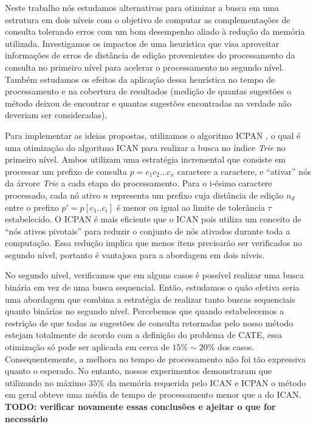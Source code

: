 Neste trabalho nós estudamos alternativas para otimizar a busca em uma estrutura em dois níveis com o objetivo de computar as complementações de consulta tolerando erros com um bom desempenho aliado à redução da memória utilizada. Investigamos os impactos de uma heurística que visa aproveitar informações de erros de distância de edição provenientes do processamento da consulta no primeiro nível para acelerar o processamento no segundo nível. Também estudamos os efeitos da aplicação dessa heurística no tempo de processamento e na cobertura de resultados (medição de quantas sugestões o método deixou de encontrar e quantas sugestões encontradas na verdade não deveriam ser consideradas). 

Para implementar as ideias propostas, utilizamos o algoritmo ICPAN \citep{li2011efficient}, o qual é uma otimização do algoritmo ICAN \citep{ji2009efficient} para realizar a busca no índice \textit{Trie} no primeiro nível. Ambos utilizam uma estratégia incremental que consiste em processar um prefixo de consulta $p=c_{1}c_{2}...c_{x}$ caractere a caractere, e ``ativar'' nós da árvore \textit{Trie} a cada etapa do processamento. Para o i-ésimo caractere processado, cada nó ativo $n$ representa um prefixo cuja distância de edição $n_{d}$ entre o prefixo $p'=p[c_{1}..c_{i}]$ é menor ou igual ao limite de tolerância $\tau$ estabelecido. O ICPAN é mais eficiente que o ICAN pois utiliza um conceito de ``nós ativos pivotais'' para reduzir o conjunto de nós ativados durante toda a computação. Essa redução implica que menos itens precisarão ser verificados no segundo nível, portanto é vantajosa para a abordagem em dois níveis.

No segundo nível, verificamos que em alguns casos é possível realizar uma busca binária em vez de uma busca sequencial. Então, estudamos o quão efetiva seria uma abordagem que combina a estratégia de realizar tanto buscas sequenciais quanto binárias no segundo nível. Percebemos que quando estabelecemos a restrição de que todas as sugestões de consulta retornadas pelo nosso método estejam totalmente de acordo com a definição do problema de CATE, essa otimização só pode ser aplicada em cerca de $15\%\sim20\%$ dos casos. Consequentemente, a melhora no tempo de processamento não foi tão expressiva quanto o esperado. No entanto, nossos experimentos demonstraram que utilizando no máximo $35\%$ da memória requerida pelo ICAN e ICPAN o método em geral obteve uma média de tempo de processamento menor que a do ICAN.
\textbf{TODO: verificar novamente essas conclusões e ajeitar o que for necessário}

